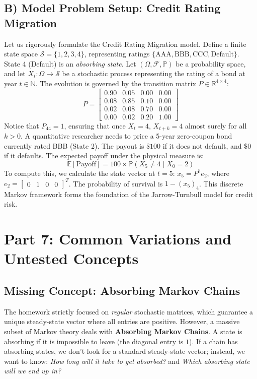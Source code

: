 \documentclass[11pt, letterpaper]{article}
\theoremstyle{definition}
\theoremstyle{remark}
\newcommand{\R}{\mathbb{R}}
\newcommand{\N}{\mathbb{N}}
\newcommand{\E}{\mathbb{E}}
\newcommand{\Prob}{\mathbb{P}}
\newcommand{\F}{\mathcal{F}}
\begin{document}
\subsection{B) Model Problem Setup: Credit Rating Migration}
Let us rigorously formulate the Credit Rating Migration model. Define a finite state space $\mathcal{S} = \{1, 2, 3, 4\}$, representing ratings $\{\text{AAA}, \text{BBB}, \text{CCC}, \text{Default}\}$. State 4 (Default) is an \textit{absorbing state}.
Let $(\Omega, \F, \Prob)$ be a probability space, and let $X_t : \Omega \to \mathcal{S}$ be a stochastic process representing the rating of a bond at year $t \in \N$. The evolution is governed by the transition matrix $P \in \R^{4 \times 4}$:
\[ P = \begin{bmatrix} 
0.90 & 0.05 & 0.00 & 0.00 \\
0.08 & 0.85 & 0.10 & 0.00 \\
0.02 & 0.08 & 0.70 & 0.00 \\
0.00 & 0.02 & 0.20 & 1.00 
\end{bmatrix} \]
Notice that $P_{44} = 1$, ensuring that once $X_t = 4$, $X_{t+k} = 4$ almost surely for all $k > 0$.
A quantitative researcher needs to price a 5-year zero-coupon bond currently rated BBB (State 2). The payout is $\$100$ if it does not default, and $\$0$ if it defaults. The expected payoff under the physical measure is:
\[ \E[\text{Payoff}] = 100 \times \Prob(X_5 \neq 4 \mid X_0 = 2) \]
To compute this, we calculate the state vector at $t=5$: $x_5 = P^5 e_2$, where $e_2 = \begin{bmatrix} 0 & 1 & 0 & 0 \end{bmatrix}^T$. The probability of survival is $1 - (x_5)_4$. This discrete Markov framework forms the foundation of the Jarrow-Turnbull model for credit risk.

\newpage
\section{Part 7: Common Variations and Untested Concepts}

\subsection{Missing Concept: Absorbing Markov Chains}
The homework strictly focused on \textit{regular} stochastic matrices, which guarantee a unique steady-state vector where all entries are positive. However, a massive subset of Markov theory deals with \textbf{Absorbing Markov Chains}. 
A state is absorbing if it is impossible to leave (the diagonal entry is $1$). If a chain has absorbing states, we don't look for a standard steady-state vector; instead, we want to know: \textit{How long will it take to get absorbed?} and \textit{Which absorbing state will we end up in?}
\end{document}
